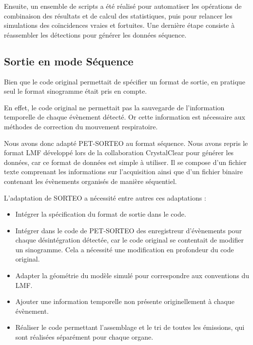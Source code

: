 Ensuite, un ensemble de scripts a été réalisé pour automatiser les opérations de combinaison des résultats et de calcul des statistiques, puis pour relancer les simulations des coïncidences vraies et fortuites. Une dernière étape consiste à réassembler les détections pour générer les données séquence.

\subsection{Sortie en mode Séquence}

Bien que le code original permettait de spécifier un format de sortie, en pratique seul le format sinogramme était pris en compte. 

En effet, le code original ne permettait pas la sauvegarde de l'information temporelle de chaque évènement détecté. Or cette information est nécessaire aux méthodes de correction du mouvement respiratoire. 

Nous avons donc adapté PET-SORTEO au format séquence. Nous avons repris le format LMF développé lors de la collaboration CrystalClear pour générer les données, car ce format de données est simple à utiliser. Il se compose d'un fichier texte comprenant les informations sur l'acquisition ainsi que d'un fichier binaire contenant les évènements organisés de manière séquentiel.

 L'adaptation de SORTEO a nécessité entre autres ces adaptations :

\begin{itemize}
\item Intégrer la spécification du format de sortie dans le code.
\item Intégrer dans le code de PET-SORTEO des enregistreur d'évènements pour chaque désintégration détectée, car le code original se contentait de modifier un sinogramme. Cela a nécessité une modification en profondeur du code original.
\item Adapter la géométrie du modèle simulé pour correspondre aux conventions du LMF.
\item Ajouter une information temporelle non présente originellement à chaque évènement.
\item Réaliser le code permettant l'assemblage et le tri de toutes les émissions, qui sont réalisées séparément pour chaque organe.
\end{itemize}


